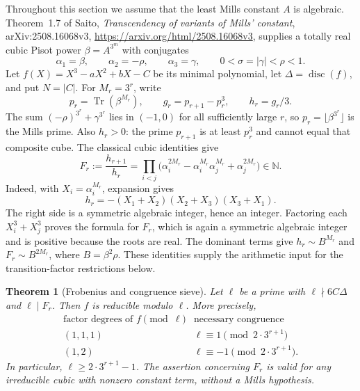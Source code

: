 \documentclass[11pt,a4paper]{article}
\newtheorem{theorem}{Theorem}[section]
\theoremstyle{definition}
\theoremstyle{remark}
\numberwithin{equation}{section}
\begin{document}
Throughout this section we assume that the least Mills constant $A$ is
algebraic.  Theorem~1.7 of Saito, \emph{Transcendency of variants of Mills'
constant}, arXiv:2508.16068v3,
\url{https://arxiv.org/html/2508.16068v3}, supplies a totally real cubic
Pisot power $\beta=A^{3^m}$ with conjugates
\[
 \alpha_1=\beta,\qquad \alpha_2=-\rho,\qquad \alpha_3=\gamma,
 \qquad 0<\sigma=|\gamma|<\rho<1.
\]
Let $f(X)=X^3-aX^2+bX-C$ be its minimal polynomial, let
$\Delta=\operatorname{disc}(f)$, and put $N=|C|$.
For $M_r=3^r$, write
\[
 p_r=\operatorname{Tr}(\beta^{M_r}),\qquad
 g_r=p_{r+1}-p_r^3,\qquad h_r=g_r/3.
\]
The sum $(-\rho)^{3^r}+\gamma^{3^r}$ lies in $(-1,0)$ for all sufficiently
large $r$, so $p_r=\lfloor\beta^{3^r}\rfloor$ is the Mills prime.
Also $h_r>0$: the prime $p_{r+1}$ is at least $p_r^3$ and cannot equal that
composite cube.  The classical cubic identities give
\[
 F_r:=\frac{h_{r+1}}{h_r}
 =\prod_{i<j}\bigl(\alpha_i^{2M_r}
       -\alpha_i^{M_r}\alpha_j^{M_r}+\alpha_j^{2M_r}\bigr)
 \in\mathbb N.
\]
Indeed, with $X_i=\alpha_i^{M_r}$, expansion gives
\[
 h_r=-(X_1+X_2)(X_2+X_3)(X_3+X_1).
\]
The right side is a symmetric algebraic integer, hence an integer.
Factoring each $X_i^3+X_j^3$ proves the formula for $F_r$, which is again
a symmetric algebraic integer and is positive because the roots are real.
The dominant terms give $h_r\sim B^{M_r}$ and $F_r\sim B^{2M_r}$, where
$B=\beta^2\rho$.  These identities supply the arithmetic input for the transition-factor
restrictions below.

\begin{theorem}[Frobenius and congruence sieve]\label{mil:thm:cubic-frobenius-sieve}
Let $\ell$ be a prime with $\ell\nmid6C\Delta$ and $\ell\mid F_r$.
Then $f$ is reducible modulo $\ell$.  More precisely,
\[
 \begin{array}{c|c}
 \text{factor degrees of }f\pmod\ell&\text{necessary congruence}\\ \hline
 (1,1,1)&\ell\equiv1\pmod{2\cdot3^{r+1}}\\
 (1,2)&\ell\equiv-1\pmod{2\cdot3^{r+1}}.
 \end{array}
\]
In particular, $\ell\geq2\cdot3^{r+1}-1$.
The assertion concerning $F_r$ is valid for any irreducible cubic with
nonzero constant term, without a Mills hypothesis.
\end{theorem}
\end{document}
